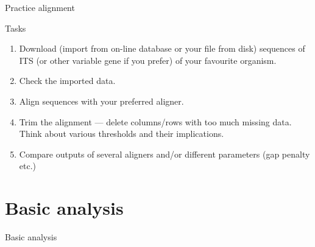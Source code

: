 \documentclass[compress, ucs, xelatex, 11pt, xcolor=svgnames, aspectratio=169,
	hyperref={
		bookmarks=true,
		unicode=true,
		colorlinks=true,
		pdftitle={Molecular data in R},
		plainpages=false,
		pdfauthor={Vojtech Zeisek},
		pdfsubject={Course about phylogeny and evolution in R},
		pdfcreator={XeLaTeX},
		pdfkeywords={R, evolution, phylogeny, molecular data},
		linkcolor=Crimson, %
		anchorcolor=Magenta, %
		citecolor=Magenta, %
		filecolor=Magenta, %
		menucolor=Magenta, %
		urlcolor=DodgerBlue, %
		pdftex},
	url={hyphens, lowtilde} %
	]{beamer}
\begin{document}
\begin{frame}[fragile]{Practice alignment}
	\begin{exampleblock}{Tasks}
		\begin{enumerate}
			\item Download (import from on-line database or your file from disk) sequences of ITS (or other variable gene if you prefer) of your favourite organism.
			\item Check the imported data.
			\item Align sequences with your preferred aligner.
			\item Trim the alignment --- delete columns/rows with too much missing data. Think about various thresholds and their implications.
			\item Compare outputs of several aligners and/or different parameters (gap penalty etc.)
		\end{enumerate}
	\end{exampleblock}
\end{frame}

\section{Basic analysis}

\begin{frame}{Basic analysis}
	\tableofcontents[currentsection, sectionstyle=show/hide, hideothersubsections]
\end{frame}
\end{document}
